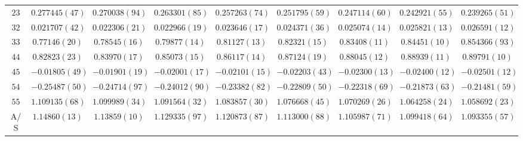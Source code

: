 \begin{sidewaystable}
\begin{center}
\begin{tabular}{c|c c c c c c c c}
$23$ & $0.277445(47)$ & $0.270038(94)$ & $0.263301(85)$ & $0.257263(74)$ & $0.251795(59)$ & $0.247114(60)$ & $0.242921(55)$ & $0.239265(51)$ \\
$32$ & $0.021707(42)$ & $0.022306(21)$ & $0.022966(19)$ & $0.023646(17)$ & $0.024371(36)$ & $0.025074(14)$ & $0.025821(13)$ & $0.026591(12)$ \\
$33$ & $0.77146(20)$ & $0.78545(16)$ & $0.79877(14)$ & $0.81127(13)$ & $0.82321(15)$ & $0.83408(11)$ & $0.84451(10)$ & $0.854366(93)$ \\
$44$ & $0.82823(23)$ & $0.83970(17)$ & $0.85073(15)$ & $0.86117(14)$ & $0.87124(19)$ & $0.88045(12)$ & $0.88939(11)$ & $0.89791(10)$ \\
$45$ & $-0.01805(49)$ & $-0.01901(19)$ & $-0.02001(17)$ & $-0.02101(15)$ & $-0.02203(43)$ & $-0.02300(13)$ & $-0.02400(12)$ & $-0.02501(12)$ \\
$54$ & $-0.25487(50)$ & $-0.24714(97)$ & $-0.24012(90)$ & $-0.23382(82)$ & $-0.22809(50)$ & $-0.22318(69)$ & $-0.21873(63)$ & $-0.21481(59)$ \\
$55$ & $1.109135(68)$ & $1.099989(34)$ & $1.091564(32)$ & $1.083857(30)$ & $1.076668(45)$ & $1.070269(26)$ & $1.064258(24)$ & $1.058692(23)$ \\
\hline
A/S & $1.14860(13)$ & $1.13859(10)$ & $1.129335(97)$ & $1.120873(87)$ & $1.113000(88)$ & $1.105987(71)$ & $1.099418(64)$ & $1.093355(57)$ \\
\hline
\hline
\end{tabular}
\end{center}
\end{sidewaystable}